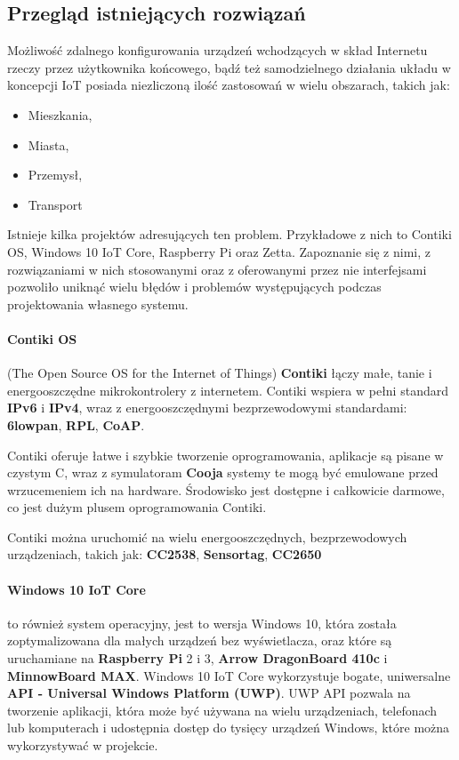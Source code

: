 \subsection{Przegląd istniejących rozwiązań}
\label{sec:existing-systems}
Możliwość zdalnego konfigurowania urządzeń wchodzących w skład Internetu rzeczy przez użytkownika końcowego, bądź też samodzielnego działania układu w koncepcji IoT posiada niezliczoną ilość zastosowań w wielu obszarach, takich jak:

 \begin{itemize}
	\item Mieszkania,
	\item Miasta,
	\item Przemysł,
	\item Transport
\end{itemize}

Istnieje kilka projektów adresujących ten problem. Przykładowe z nich to Contiki OS, Windows 10 IoT Core, Raspberry Pi oraz Zetta. Zapoznanie się z nimi, z rozwiązaniami w nich stosowanymi oraz z oferowanymi przez nie interfejsami pozwoliło uniknąć wielu błędów i problemów występujących podczas projektowania własnego systemu.

\paragraph{Contiki OS}\cite{contiki-www} (The Open Source OS for the Internet of Things) \textbf{Contiki} łączy małe, tanie i energooszczędne mikrokontrolery z internetem. Contiki wspiera w pełni standard \textbf{IPv6} i \textbf{IPv4}, wraz z energooszczędnymi bezprzewodowymi standardami: \textbf{6lowpan}, \textbf{RPL}, \textbf{CoAP}. 

Contiki oferuje łatwe i szybkie tworzenie oprogramowania, aplikacje są pisane w czystym C, wraz z symulatoram \textbf{Cooja} systemy te mogą być emulowane przed wrzucemeniem ich na hardware. Środowisko jest dostępne i całkowicie darmowe, co jest dużym plusem oprogramowania Contiki.

Contiki można uruchomić na wielu energooszczędnych, bezprzewodowych urządzeniach, takich jak\cite{contiki-hardware-www}: \textbf{CC2538}, \textbf{Sensortag}, \textbf{CC2650}

\paragraph{Windows 10 IoT Core}\cite{windows-iot-www} to również system operacyjny, jest to wersja Windows 10, która została zoptymalizowana dla małych urządzeń bez wyświetlacza, oraz które są uruchamiane na \textbf{Raspberry Pi} 2 i 3, \textbf{Arrow DragonBoard 410c} i \textbf{MinnowBoard MAX}. 
Windows 10 IoT Core wykorzystuje bogate, uniwersalne \textbf{API - Universal Windows Platform (UWP)}. UWP API pozwala na tworzenie aplikacji, która może być używana na wielu urządzeniach, telefonach lub komputerach i udostępnia dostęp do tysięcy urządzeń Windows, które można wykorzystywać w projekcie.

